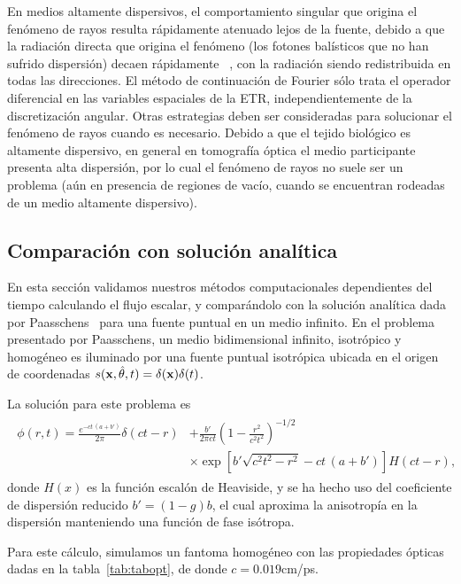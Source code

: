 En medios altamente dispersivos, el comportamiento singular 
que origina el fenómeno de rayos resulta rápidamente atenuado lejos 
de la fuente, debido a que la radiación directa que origina el fenómeno 
(los fotones balísticos que no han sufrido dispersión) decaen rápidamente
~\cite{Ramankutty1997}, con la radiación siendo redistribuida en todas las 
direcciones. El método de continuación de Fourier sólo trata 
el operador diferencial en las variables espaciales de la ETR, independientemente 
de la discretización angular. Otras estrategias deben ser consideradas 
para solucionar el fenómeno de rayos cuando es necesario. Debido 
a que el tejido biológico es altamente dispersivo, en general 
en tomografía óptica el medio participante presenta alta dispersión, 
por lo cual el fenómeno de rayos no suele ser un problema (aún 
en presencia de regiones de vacío, cuando se encuentran rodeadas de un 
medio altamente dispersivo).

\subsection{Comparación con solución analítica}

En esta sección validamos nuestros métodos computacionales 
dependientes del tiempo calculando el flujo escalar, 
y comparándolo con la solución analítica dada por Paasschens~\cite{Paasschens1997} 
para una fuente puntual en un medio infinito. 
En el problema presentado por Paasschens, un medio bidimensional infinito, 
isotrópico y homogéneo es iluminado por una fuente puntual isotrópica
ubicada en el origen de coordenadas $s(\mathbf{x},\hat{\theta},t)=\delta(\mathbf{x})\delta(t)$.

La solución para este problema es
\begin{equation}
\begin{split}
\begin{aligned}
\phi(r,t)=\frac{e^{-c t \, (a+b')}}{2\pi}\delta(ct-r)&+\frac{b'}{2\pi c t}\left(1-\frac{r^2}{c^2t^2}\right)^{-1/2}\\
&\times\exp\left[b'\sqrt{c^2t^2-r^2}-c t \, (a+b')\right]H(ct-r),
\end{aligned}
\end{split}
\label{eq:Paasschenssc}
\end{equation}
donde $H(x)$ es la función escalón de Heaviside, 
y se ha hecho uso del coeficiente de dispersión reducido $b'=(1-g)b$, 
el cual aproxima la anisotropía en la dispersión manteniendo una 
función de fase isótropa.

Para este cálculo, simulamos un fantoma homogéneo con las propiedades ópticas 
dadas en la tabla~\ref{tab:tabopt}, de donde $c=0.019$cm/ps.

